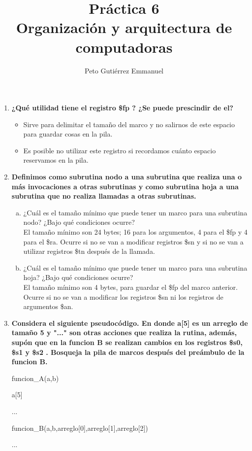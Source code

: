 \documentclass{article}
\title{Práctica 6 \\ Organización y arquitectura de computadoras}
\author{Peto Gutiérrez Emmanuel}
\begin{document}
\maketitle

\begin{enumerate}[1.]
\item \textbf{¿Qué utilidad tiene el registro \$fp ? ¿Se puede prescindir de el?}
	\begin{itemize}
	\item Sirve para delimitar el tamaño del marco y no salirnos de este espacio para guardar cosas en la pila.
	\item Es posible no utilizar este registro si recordamos cuánto espacio reservamos en la pila.
	\end{itemize}
	
\item \textbf{Definimos como subrutina nodo a una subrutina que realiza una o más invocaciones a otras subrutinas y como subrutina hoja a una subrutina que no realiza llamadas a otras subrutinas.}
	\begin{enumerate}[a)]
	\item ¿Cuál es el tamaño mínimo que puede tener un marco para una subrutina nodo? ¿Bajo qué condiciones ocurre? \\
	
	El tamaño mínimo son 24 bytes; 16 para los argumentos, 4 para el \$fp y 4 para el \$ra. Ocurre si no se van a modificar registros \$sn y si no se van a utilizar registros \$tn después de la llamada.
	\\
	\item ¿Cuál es el tamaño mínimo que puede tener un marco para una subrutina hoja? ¿Bajo qué condiciones ocurre? \\
	
	El tamaño mínimo son 4 bytes, para guardar el \$fp del marco anterior. Ocurre si no se van a modificar los registros \$sn ni los registros de argumentos \$an.
	\end{enumerate}
\item \textbf{Considera el siguiente pseudocódigo. En donde a[5] es un arreglo de tamaño 5 y "..."  son otras acciones que realiza la rutina, además, supón que en la funcion B se realizan cambios en los registros \$s0, \$s1 y \$s2 . Bosqueja la pila de marcos después del preámbulo de la funcion B.}

funcion\_A(a,b)

\hspace{0.5cm}a[5]

\hspace{0.5cm}...

\hspace{0.5cm}funcion\_B(a,b,arreglo[0],arreglo[1],arreglo[2])

\hspace{0.5cm}...
\end{enumerate}
\end{document}
